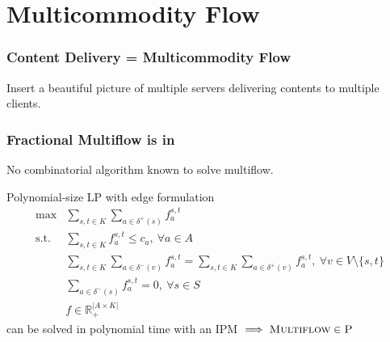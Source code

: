 \documentclass{beamer}
\begin{document}
\section{Multicommodity Flow}
\begin{frame}
    \frametitle{Content Delivery = Multicommodity Flow}

    Insert a beautiful picture of multiple servers delivering contents to
    multiple clients.

\end{frame}

\begin{frame}
    \frametitle{Fractional Multiflow is in }
    
    No combinatorial algorithm known to solve multiflow.

    \begin{block}{Polynomial-size LP with edge formulation}
    \begin{align*}
        \max & \sum_{s,t \in K} \sum_{a \in \delta^+(s)} f_a^{s,t}\\
        \text{s.t.} & \sum_{s,t \in K} f_a^{s,t} \leq c_a, ~\forall a \in A\\
                    & \sum_{s,t\in K} \sum_{a \in \delta^-(v)} f_a^{s,t} =
                      \sum_{s,t \in K} \sum_{a \in \delta^+(v)} f_a^{s,t},
                      ~ \forall v \in V \setminus \{s,t\}\\
                    & \sum_{a \in \delta^-(s)} f_a^{s,t} = 0,
                      ~ \forall s \in S \\
                    & f\in \mathbb{R}_+^{|A \times K|}
    \end{align*}
    can be solved in polynomial time with an IPM $\implies \textsc{Multiflow}
    \in \textsc{P}$
    \end{block}

\end{frame}
\end{document}

